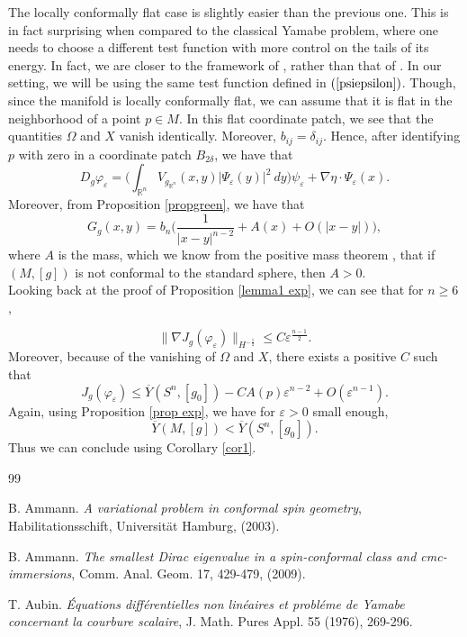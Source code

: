 \documentclass[11pt]{article}
\def \R {\mathbb{R}}
\begin{document}
{The locally conformally flat case is slightly easier than the previous one. This is in fact surprising when compared to the classical Yamabe problem, where one needs to choose a different test function with more control on the tails of its energy. In fact, we are closer to the framework of \cite{HV}, rather than that of \cite{S}. In our setting, we will be using the same test function defined in $(\ref{psiepsilon})$. Though, since the manifold is locally conformally flat, we can assume that it is flat in the neighborhood of a point $p\in M$. In this flat coordinate patch, we see that the quantities $\Omega$ and $X$ vanish identically. Moreover, $b_{ij}=\delta_{ij}$. Hence, after identifying $p$ with zero in a coordinate patch $B_{2\delta}$, we have that
$$D_{g}\varphi_{\varepsilon}=\Big(\int_{\R^{n}}V_{g_{\R^{n}}}(x,y)|\Psi_{\varepsilon}(y)|^{2}\ dy  \Big)\psi_{\varepsilon} +\nabla \eta \cdot \Psi_{\varepsilon}(x).$$
Moreover, from Proposition \ref{propgreen}, we have that
$$G_{g}(x,y)=b_{n}\Big(\frac{1}{|x-y|^{n-2}}+A(x) + O(|x-y|)\Big),$$
where $A$ is the mass, which we know from the positive mass theorem \cite{W,PT}, that if $(M,[g])$ is not conformal to the standard sphere, then $A>0$.\\
Looking back at the proof of Proposition \ref{lemma1 exp}, we can see that for $n\geq 6$,

$$\|\nabla J_{g}(\varphi_{\varepsilon})\|_{H^{-\frac{1}{2}}}\leq C \varepsilon^{\frac{n-1}{2}}.$$
Moreover, because of the vanishing of $\Omega$ and $X$, there exists a positive $C$ such that
$$J_{g}(\varphi_{\varepsilon})\leq \overline{Y}(S^{n},[g_{0}])-CA(p)\varepsilon^{n-2}+O(\varepsilon^{n-1}).$$
Again, using Proposition \ref{prop exp}, we have for $\varepsilon>0$ small enough,
$$\overline{Y}(M,[g])<\overline{Y}(S^{n},[g_{0}]).$$
Thus we can conclude using Corollary \ref{cor1}.






\begin{thebibliography}{99}

 B. Ammann.  \emph{A variational problem in conformal spin geometry}, Habilitationsschift, Universit\"{a}t Hamburg, (2003).

 B. Ammann. \emph{The smallest Dirac eigenvalue in a spin-conformal class and cmc-immersions}, Comm. Anal. Geom. 17, 429-479, (2009).

 T. Aubin.  \emph{\'{E}quations diff\'{e}rentielles non lin\'{e}aires et probl\'{e}me de Yamabe concernant la courbure scalaire}, J. Math. Pures Appl. 55 (1976), 269-296. 


\end{thebibliography}}
\end{document}
